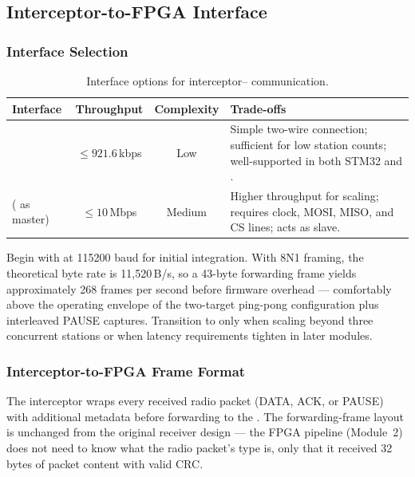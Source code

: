 \documentclass[11pt,letterpaper]{article}
\begin{document}
	\subsection{Interceptor-to-FPGA Interface}

	\subsubsection{Interface Selection}

	\begin{table}[ht!]
		\centering
		\caption{Interface options for interceptor--\FPGA{} communication.}
		\label{tab:interface}
		\renewcommand{\arraystretch}{1.3}
		\begin{tabularx}{\textwidth}{l c c X}
			\toprule
			\textbf{Interface} & \textbf{Throughput} & \textbf{Complexity} & \textbf{Trade-offs} \\
			\midrule
			\UART{} & $\leq 921.6$\,kbps & Low & Simple two-wire connection; sufficient for low station counts; well-supported in both STM32 \HAL{} and \VHDL{}. \\
			\SPI{} (\MCU{} as master) & $\leq 10$\,Mbps & Medium & Higher throughput for scaling; requires clock, MOSI, MISO, and CS lines; \FPGA{} acts as \SPI{} slave. \\
			\bottomrule
		\end{tabularx}
	\end{table}

	\begin{tcolorbox}[infobox={Recommendation}]
		Begin with \UART{} at 115200 baud for initial integration. With 8N1 framing, the theoretical byte rate is 11{,}520\,B/s, so a 43-byte forwarding frame yields approximately 268 frames per second before firmware overhead --- comfortably above the operating envelope of the two-target ping-pong configuration plus interleaved PAUSE captures. Transition to \SPI{} only when scaling beyond three concurrent stations or when latency requirements tighten in later modules.
	\end{tcolorbox}

	\subsubsection{Interceptor-to-FPGA Frame Format}

	The interceptor wraps every received radio packet (DATA, ACK, or PAUSE) with additional metadata before forwarding to the \FPGA{}. The forwarding-frame layout is unchanged from the original receiver design --- the FPGA pipeline (Module~2) does not need to know what the radio packet's type is, only that it received 32 bytes of packet content with valid CRC.
\end{document}
